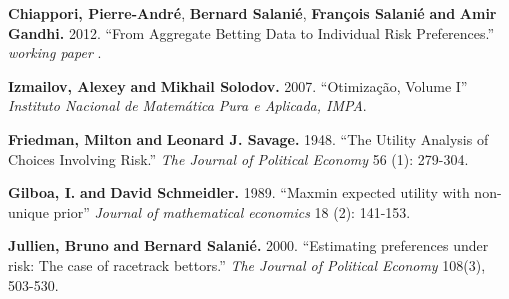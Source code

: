 \documentclass[pdftex]{article}
\numberwithin{equation}{section}
\theoremstyle{th}
\newtheorem{proof lemma}{{Proof Lemma}.}
\theoremstyle{definition}
\newtheorem*{risk lovers}{Risk lovers}
\newtheorem*{risk averse}{Risk averse}
\begin{document}
{\begin{thebibliography}{}
\textbf{Chiappori, Pierre-Andr\'{e}}, \textbf{Bernard Salani\'{e}}, \textbf{Fran\c{c}ois Salani\'{e}} \textbf{and} \textbf{Amir Gandhi.} 2012. ``{From Aggregate Betting Data
to Individual Risk Preferences.}'' \emph{working paper} .







\textbf{Izmailov, Alexey} \textbf{and} \textbf{Mikhail Solodov.} 2007. ``{Otimiza\c{c}\~{a}o, Volume I}'' \emph{Instituto Nacional de Matem\'{a}tica Pura e Aplicada, IMPA}.


\textbf{Friedman, Milton} \textbf{and} \textbf{Leonard J. Savage.} 1948. ``{The Utility Analysis of Choices Involving Risk.}'' \emph{The Journal of Political Economy} 56 ({1}): 279-304.

\textbf{Gilboa, I.} \textbf{and} \textbf{David Schmeidler.} 1989. ``{Maxmin expected utility with non-unique prior}'' \emph{Journal of mathematical economics} 18 ({2}): 141-153.


\textbf{Jullien, Bruno} \textbf{and} \textbf{Bernard Salani\'{e}.} 2000. ``{Estimating preferences under risk: The case of racetrack bettors.}'' \emph{The Journal of Political Economy} 108(3), 503-530.


\end{thebibliography}}
\end{document}
